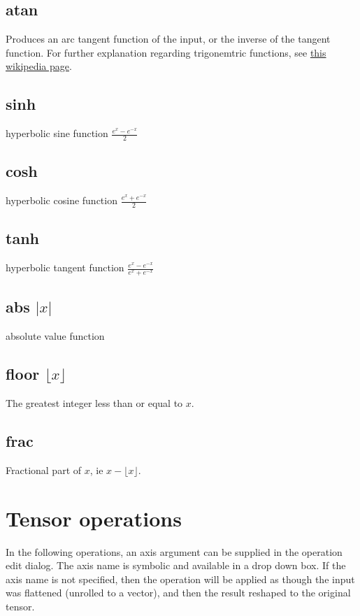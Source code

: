 \subsection{atan}\label{Operation:atan} Produces an arc tangent function of the input, 
or the inverse of the tangent function. For further explanation regarding trigonemtric functions, 
see \href{https://en.wikipedia.org/wiki/Trigonometric_functions}{this wikipedia page}.

\subsection{sinh}\label{Operation:sinh} hyperbolic sine function $\frac{e^x-e^{-x}}2$
\subsection{cosh}\label{Operation:cosh} hyperbolic cosine function $\frac{e^x+e^{-x}}2$
\subsection{tanh}\label{Operation:tanh} hyperbolic tangent function $\frac{e^x-e^{-x}}{e^x+e^{-x}}$
\subsection{abs $|x|$}\label{Operation:abs} absolute value function
\subsection{floor $\lfloor x\rfloor$}\label{Operation:floor} The greatest integer
  less than or equal to $x$.
\subsection{frac}\label{Operation:frac} Fractional part of $x$, ie $x-\lfloor x\rfloor$. 

\section{Tensor operations}\label{tensor operations}

In the following operations, an axis argument can be supplied in the
operation edit dialog. The axis name is symbolic and available in a
drop down box. If the axis name is not specified, then the operation
will be applied as though the input was flattened (unrolled to a
vector), and then the result reshaped to the original tensor.

